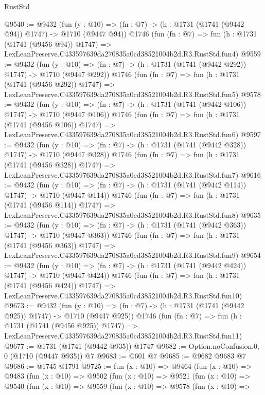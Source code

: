 \begin{lexlean}{RustStd}
\begin{coremodule}
@9540 := @9432
    (fun (y : @10) => (fn : @7) -> (h : @1731 (@1741 (@9442 @94)) @1747) -> @1710 (@9447 @94))
    @1746
    (fun (fn : @7) =>
    fun (h : @1731 (@1741 (@9456 @94)) @1747) =>
    LexLeanPreserve.C433597639da270835a0cd38521004b2d.R3.RustStd.fun4)
@9559 := @9432
    (fun (y : @10) => (fn : @7) -> (h : @1731 (@1741 (@9442 @292)) @1747) -> @1710 (@9447 @292))
    @1746
    (fun (fn : @7) =>
    fun (h : @1731 (@1741 (@9456 @292)) @1747) =>
    LexLeanPreserve.C433597639da270835a0cd38521004b2d.R3.RustStd.fun5)
@9578 := @9432
    (fun (y : @10) => (fn : @7) -> (h : @1731 (@1741 (@9442 @106)) @1747) -> @1710 (@9447 @106))
    @1746
    (fun (fn : @7) =>
    fun (h : @1731 (@1741 (@9456 @106)) @1747) =>
    LexLeanPreserve.C433597639da270835a0cd38521004b2d.R3.RustStd.fun6)
@9597 := @9432
    (fun (y : @10) => (fn : @7) -> (h : @1731 (@1741 (@9442 @328)) @1747) -> @1710 (@9447 @328))
    @1746
    (fun (fn : @7) =>
    fun (h : @1731 (@1741 (@9456 @328)) @1747) =>
    LexLeanPreserve.C433597639da270835a0cd38521004b2d.R3.RustStd.fun7)
@9616 := @9432
    (fun (y : @10) => (fn : @7) -> (h : @1731 (@1741 (@9442 @114)) @1747) -> @1710 (@9447 @114))
    @1746
    (fun (fn : @7) =>
    fun (h : @1731 (@1741 (@9456 @114)) @1747) =>
    LexLeanPreserve.C433597639da270835a0cd38521004b2d.R3.RustStd.fun8)
@9635 := @9432
    (fun (y : @10) => (fn : @7) -> (h : @1731 (@1741 (@9442 @363)) @1747) -> @1710 (@9447 @363))
    @1746
    (fun (fn : @7) =>
    fun (h : @1731 (@1741 (@9456 @363)) @1747) =>
    LexLeanPreserve.C433597639da270835a0cd38521004b2d.R3.RustStd.fun9)
@9654 := @9432
    (fun (y : @10) => (fn : @7) -> (h : @1731 (@1741 (@9442 @424)) @1747) -> @1710 (@9447 @424))
    @1746
    (fun (fn : @7) =>
    fun (h : @1731 (@1741 (@9456 @424)) @1747) =>
    LexLeanPreserve.C433597639da270835a0cd38521004b2d.R3.RustStd.fun10)
@9673 := @9432
    (fun (y : @10) => (fn : @7) -> (h : @1731 (@1741 (@9442 @925)) @1747) -> @1710 (@9447 @925))
    @1746
    (fun (fn : @7) =>
    fun (h : @1731 (@1741 (@9456 @925)) @1747) =>
    LexLeanPreserve.C433597639da270835a0cd38521004b2d.R3.RustStd.fun11)
@9677 := @1731 (@1741 (@9442 @935)) @1747
@9682 := Option.noConfusion.{0, 0} (@1710 (@9447 @935)) @7
@9683 := @601 @7
@9685 := @9682 @9683 @7
@9686 := @1745 @1791
@9725 := fun (x : @10) =>
  @9464
    (fun (x : @10) =>
    @9483
      (fun (x : @10) =>
      @9502
        (fun (x : @10) =>
        @9521
          (fun (x : @10) =>
          @9540
            (fun (x : @10) =>
            @9559
              (fun (x : @10) =>
              @9578
                (fun (x : @10) =>

\end{coremodule}
\end{lexlean}
